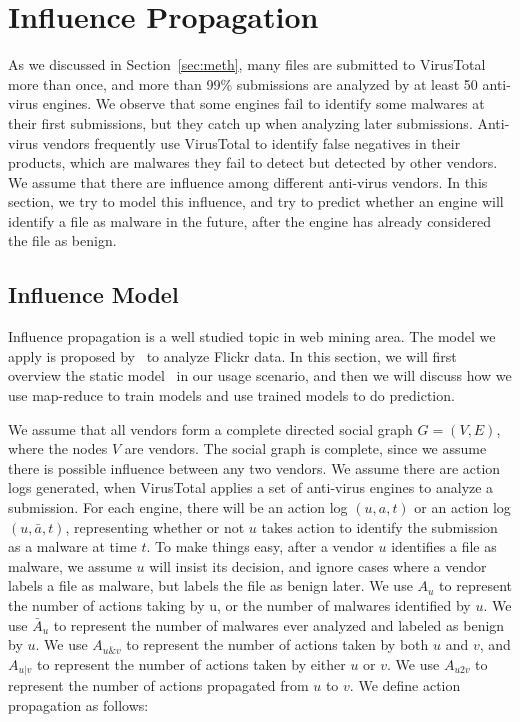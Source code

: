 \section{Influence Propagation}
\label{sec:influ}

As we discussed in Section~\ref{sec:meth}, 
many files are submitted to VirusTotal more than once, and more than 99\% submissions are analyzed by at least 50 anti-virus engines. 
We observe that some engines fail to identify some malwares at their first submissions, 
but they catch up when analyzing later submissions. 
Anti-virus vendors frequently use VirusTotal to identify false negatives in their products, 
which are malwares they fail to detect but detected by other vendors. 
We assume that there are influence among different anti-virus vendors.
In this section, we try to model this influence,
and try to predict whether an engine will identify a file as malware in the future, 
after the engine has already considered the file as benign.

\subsection{Influence Model}
\label{sec:model}

Influence propagation is a well studied topic in web mining area. 
The model we apply is proposed by~\citet{Influence} to analyze Flickr data.
In this section, we will first overview the static model~\cite{Influence} in our usage scenario, 
and then we will discuss how we use map-reduce to train models and use trained models to do prediction.  

We assume that all vendors form a complete directed social graph $G = (V, E)$, 
where the nodes $V$ are vendors. 
The social graph is complete, 
since we assume there is possible influence between any two vendors.
We assume there are action logs generated, 
when VirusTotal applies a set of anti-virus engines to analyze a submission. 
For each engine, there will be an action log $(u, a, t)$ or an action log $(u, \bar{a}, t)$, 
representing whether or not $u$ takes action to identify the submission as a malware at time $t$. 
To make things easy, after a vendor $u$ identifies a file as malware, 
we assume $u$ will insist its decision, 
and ignore cases where a vendor labels a file as malware, but labels the file as benign later. 
We use $A_u$ to represent the number of actions taking by u, or the number of malwares identified by $u$. 
We use $\bar{A}_u$ to represent the number of malwares ever analyzed and labeled as benign by $u$.
We use $A_{u\&v}$ to represent the number of actions taken by both $u$ and $v$, and $A_{u|v}$ to represent 
the number of actions taken by either $u$ or $v$.
We use $A_{u2v}$ to represent the number of actions propagated from $u$ to $v$. 
We define action propagation as follows: 

